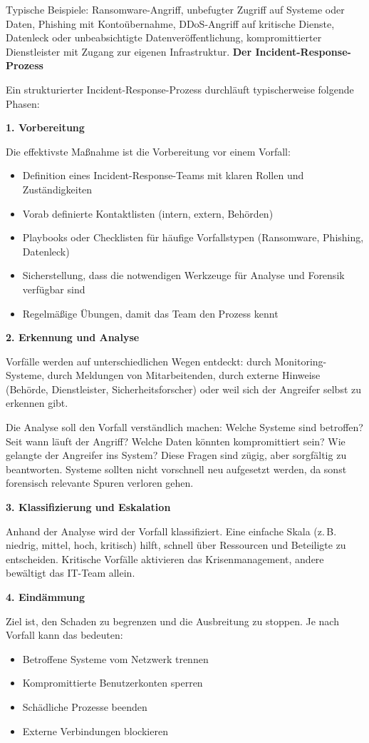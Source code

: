 Typische Beispiele: Ransomware-Angriff, unbefugter Zugriff auf Systeme oder Daten, Phishing mit Kontoübernahme, DDoS-Angriff auf kritische Dienste, Datenleck oder unbeabsichtigte Datenveröffentlichung, kompromittierter Dienstleister mit Zugang zur eigenen Infrastruktur.
\newpage
\textbf{Der Incident-Response-Prozess}

Ein strukturierter Incident-Response-Prozess durchläuft typischerweise folgende Phasen:

\textbf{1. Vorbereitung}

Die effektivste Maßnahme ist die Vorbereitung vor einem Vorfall:
\begin{itemize}
    \item Definition eines Incident-Response-Teams mit klaren Rollen und Zuständigkeiten
    \item Vorab definierte Kontaktlisten (intern, extern, Behörden)
    \item Playbooks oder Checklisten für häufige Vorfallstypen (Ransomware, Phishing, Datenleck)
    \item Sicherstellung, dass die notwendigen Werkzeuge für Analyse und Forensik verfügbar sind
    \item Regelmäßige Übungen, damit das Team den Prozess kennt
\end{itemize}

\textbf{2. Erkennung und Analyse}

Vorfälle werden auf unterschiedlichen Wegen entdeckt: durch Monitoring-Systeme, durch Meldungen von Mitarbeitenden, durch externe Hinweise (Behörde, Dienstleister, Sicherheitsforscher) oder weil sich der Angreifer selbst zu erkennen gibt.

Die Analyse soll den Vorfall verständlich machen: Welche Systeme sind betroffen? Seit wann läuft der Angriff? Welche Daten könnten kompromittiert sein? Wie gelangte der Angreifer ins System? Diese Fragen sind zügig, aber sorgfältig zu beantworten. Systeme sollten nicht vorschnell neu aufgesetzt werden, da sonst forensisch relevante Spuren verloren gehen.

\textbf{3. Klassifizierung und Eskalation}

Anhand der Analyse wird der Vorfall klassifiziert. Eine einfache Skala (z.\,B. niedrig, mittel, hoch, kritisch) hilft, schnell über Ressourcen und Beteiligte zu entscheiden. Kritische Vorfälle aktivieren das Krisenmanagement, andere bewältigt das IT-Team allein.

\textbf{4. Eindämmung}

Ziel ist, den Schaden zu begrenzen und die Ausbreitung zu stoppen. Je nach Vorfall kann das bedeuten:
\begin{itemize}
    \item Betroffene Systeme vom Netzwerk trennen
    \item Kompromittierte Benutzerkonten sperren
    \item Schädliche Prozesse beenden
    \item Externe Verbindungen blockieren
\end{itemize}

